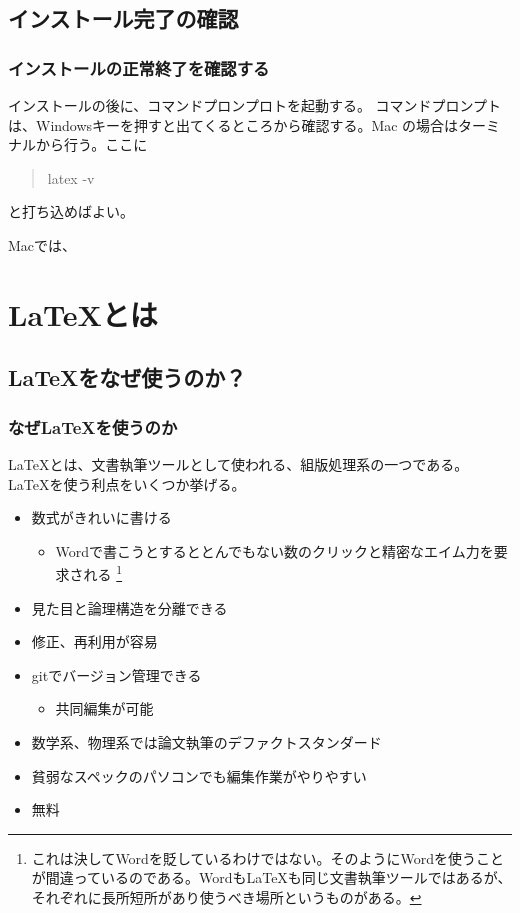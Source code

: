 \documentclass{beamer}
\begin{document}
\subsection{インストール完了の確認}
\begin{frame}
  \frametitle{インストールの正常終了を確認する}
  インストールの後に、コマンドプロンプロトを起動する。
  コマンドプロンプトは、Windowsキーを押すと出てくるところから確認する。Mac の場合はターミナルから行う。ここに
  \begin{quotation}
    latex -v
  \end{quotation}
  と打ち込めばよい。

  Macでは、

\end{frame}

\section{\LaTeX とは}
\subsection{\LaTeX をなぜ使うのか？}
\begin{frame}
  \frametitle{なぜ\LaTeX を使うのか}
  \LaTeX とは、文書執筆ツールとして使われる、組版処理系の一つである。
\LaTeX を使う利点をいくつか挙げる。
\begin{itemize}
  \item 数式がきれいに書ける
  \begin{itemize}
    \item Wordで書こうとするととんでもない数のクリックと精密なエイム力を要求される
    \footnote{これは決してWordを貶しているわけではない。そのようにWordを使うことが間違っているのである。Wordも\LaTeX も同じ文書執筆ツールではあるが、それぞれに長所短所があり使うべき場所というものがある。}
  \end{itemize}
  \item 見た目と論理構造を分離できる
  \item 修正、再利用が容易
  \item gitでバージョン管理できる
  \begin{itemize}
    \item 共同編集が可能
  \end{itemize}
  \item 数学系、物理系では論文執筆のデファクトスタンダード
  \item 貧弱なスペックのパソコンでも編集作業がやりやすい
  \item 無料
\end{itemize}
  
\end{frame}
\end{document}
